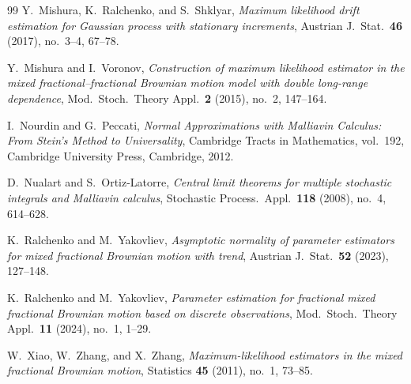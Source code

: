 \documentclass[11pt,reqno]{amsart}
\numberwithin{equation}{section}
\theoremstyle{plain}
\theoremstyle{definition}
\theoremstyle{remark}
\begin{document}
\begin{thebibliography}{99}
Y.~Mishura, K.~Ralchenko, and S.~Shklyar,
\emph{Maximum likelihood drift estimation for Gaussian process with stationary
increments},
Austrian J.\ Stat.\ \textbf{46} (2017), no.~3--4, 67--78.

Y.~Mishura and I.~Voronov,
\emph{Construction of maximum likelihood estimator in the mixed fractional--fractional
Brownian motion model with double long-range dependence},
Mod.\ Stoch.\ Theory Appl.\ \textbf{2} (2015), no.~2, 147--164.

I.~Nourdin and G.~Peccati,
\emph{Normal Approximations with Malliavin Calculus: From Stein's Method to Universality},
Cambridge Tracts in Mathematics, vol.~192, Cambridge University Press, Cambridge, 2012.

D.~Nualart and S.~Ortiz-Latorre,
\emph{Central limit theorems for multiple stochastic integrals and Malliavin calculus},
Stochastic Process.\ Appl.\ \textbf{118} (2008), no.~4, 614--628.

K.~Ralchenko and M.~Yakovliev,
\emph{Asymptotic normality of parameter estimators for mixed fractional Brownian motion
with trend},
Austrian J.\ Stat.\ \textbf{52} (2023), 127--148.

K.~Ralchenko and M.~Yakovliev,
\emph{Parameter estimation for fractional mixed fractional Brownian motion based on
discrete observations},
Mod.\ Stoch.\ Theory Appl.\ \textbf{11} (2024), no.~1, 1--29.

W.~Xiao, W.~Zhang, and X.~Zhang,
\emph{Maximum-likelihood estimators in the mixed fractional Brownian motion},
Statistics \textbf{45} (2011), no.~1, 73--85.

\end{thebibliography}
\end{document}
